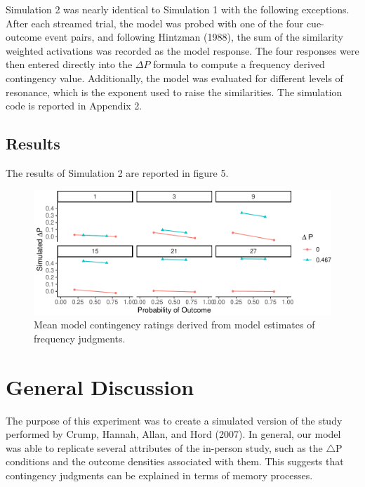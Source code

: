 \documentclass[
  english,
  man,floatsintext]{apa6}
\begin{document}
Simulation 2 was nearly identical to Simulation 1 with the following exceptions. After each streamed trial, the model was probed with one of the four cue-outcome event pairs, and following Hintzman (1988), the sum of the similarity weighted activations was recorded as the model response. The four responses were then entered directly into the \(\Delta P\) formula to compute a frequency derived contingency value. Additionally, the model was evaluated for different levels of resonance, which is the exponent used to raise the similarities. The simulation code is reported in Appendix 2.

\hypertarget{results-1}{%
\subsection{Results}\label{results-1}}

The results of Simulation 2 are reported in figure 5.

\begin{figure}

{\centering \includegraphics{Thesis_google_test_files/figure-latex/unnamed-chunk-8-1} 

}

\caption{Mean model contingency ratings derived from model estimates of frequency judgments.}\label{fig:unnamed-chunk-8}
\end{figure}

\hypertarget{general-discussion}{%
\section{General Discussion}\label{general-discussion}}

The purpose of this experiment was to create a simulated version of the study performed by Crump, Hannah, Allan, and Hord (2007). In general, our model was able to replicate several attributes of the in-person study, such as the \(\triangle\)P conditions and the outcome densities associated with them. This suggests that contingency judgments can be explained in terms of memory processes.
\end{document}
